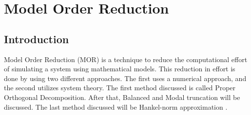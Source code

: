 \nopagebreak
\chapter{Model Order Reduction}
\section{Introduction}
Model Order Reduction (MOR) is a technique to reduce the computational effort of simulating a system using mathematical models.
This reduction in effort is done by using two different approaches. The first uses a numerical approach, and the second utilizes system theory.
The first method discussed is called Proper Orthogonal Decomposition. After that, Balanced and Modal truncation will be discussed.
The last method discussed will be Hankel-norm approximation \cite{+2021}.
